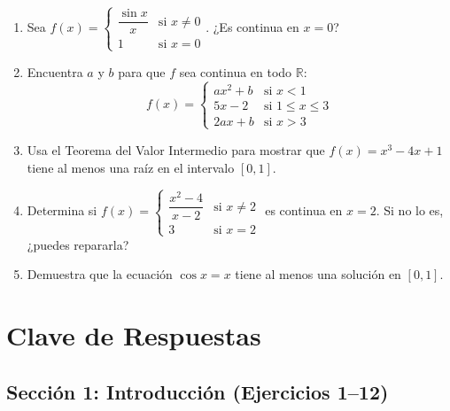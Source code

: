\documentclass[12pt, a4paper]{article}
\begin{document}
\begin{enumerate}[leftmargin=*, resume]
  \item \medio{} Sea $f(x) = \begin{cases} \dfrac{\sin x}{x} & \text{si } x \neq 0 \\ 1 & \text{si } x = 0 \end{cases}$. ¿Es continua en $x = 0$?

  \item \dificil{} Encuentra $a$ y $b$ para que $f$ sea continua en todo $\mathbb{R}$:
        $$f(x) = \begin{cases} ax^2 + b & \text{si } x < 1 \\ 5x - 2 & \text{si } 1 \le x \le 3 \\ 2a x + b & \text{si } x > 3 \end{cases}$$

  \item \dificil{} Usa el Teorema del Valor Intermedio para mostrar que $f(x) = x^3 - 4x + 1$ tiene al menos una raíz en el intervalo $[0, 1]$.

  \item \dificil{} Determina si $f(x) = \begin{cases} \dfrac{x^2 - 4}{x - 2} & \text{si } x \neq 2 \\ 3 & \text{si } x = 2 \end{cases}$ es continua en $x = 2$. Si no lo es, ¿puedes repararla?

  \item \dificil{} Demuestra que la ecuación $\cos x = x$ tiene al menos una solución en $[0, 1]$.
\end{enumerate}

\newpage

\section{Clave de Respuestas}

\subsection*{Sección 1: Introducción (Ejercicios 1--12)}
\end{document}
